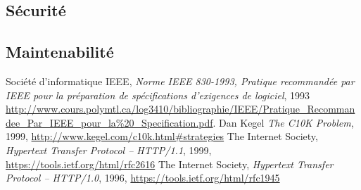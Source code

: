 \documentclass{scrreprt}
\begin{document}
\subsection{Sécurité}
\subsection{Maintenabilité}



\begin{thebibliography}{9}
  Société d'informatique IEEE,
\emph{Norme IEEE 830-1993, Pratique recommandée par IEEE pour la préparation de
spécifications d’exigences de logiciel}, 1993
\url{http://www.cours.polymtl.ca/log3410/bibliographie/IEEE/Pratique_Recommandee_Par_IEEE_pour_la%20_Specification.pdf}.
  Dan Kegel
\emph{The C10K Problem}, 1999, \url{http://www.kegel.com/c10k.html#strategies}
    The Internet Society,
\emph{Hypertext Transfer Protocol -- HTTP/1.1}, 1999,
\url{https://tools.ietf.org/html/rfc2616}
    The Internet Society,
\emph{Hypertext Transfer Protocol -- HTTP/1.0}, 1996,
\url{https://tools.ietf.org/html/rfc1945}
\end{thebibliography}

\end{document}

